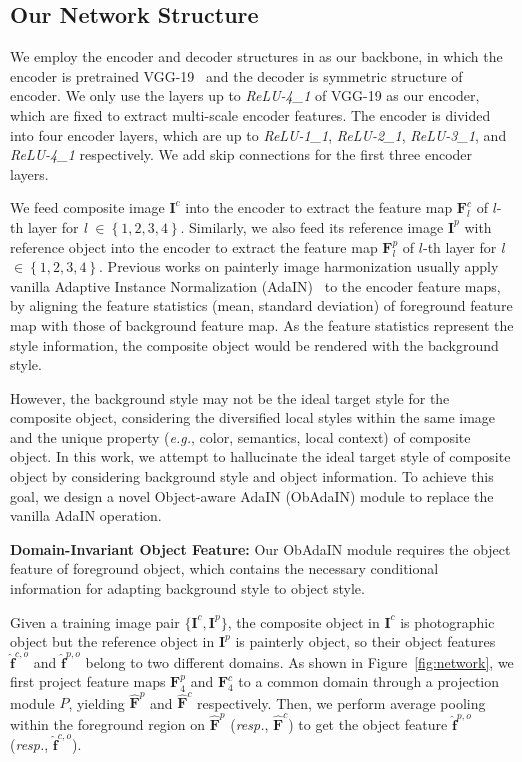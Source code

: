 \documentclass[letterpaper]{article} %
\begin{document}
\subsection{Our Network Structure} \label{sec:network_structure}

We employ the encoder and decoder structures in \cite{huang2017arbitrary} as our backbone, in which the encoder is pretrained VGG-19~\cite{VGG19} and the decoder is symmetric structure of encoder. We only use the layers up to \emph{ReLU-4\_1} of VGG-19 as our encoder, which are fixed to extract multi-scale encoder features. The encoder is divided into four encoder layers, which are up to \emph{ReLU-1\_1}, \emph{ReLU-2\_1}, \emph{ReLU-3\_1}, and \emph{ReLU-4\_1} respectively. We add skip connections for the first three encoder layers.

We feed composite image $\bm{I}^c$ into the encoder to extract the feature map $\bm{F}_l^c$ of $l$-th layer for \emph{l} $\in \left\{1, 2, 3, 4\right\}$. Similarly, we also feed its reference image $\bm{I}^p$ with reference object into the encoder to extract the feature map $\bm{F}^p_l$ of $l$-th layer for \emph{l} $\in \left\{1, 2, 3, 4\right\}$.
Previous works on painterly image harmonization \cite{peng2019element,cao2022painterly} usually apply vanilla Adaptive Instance Normalization (AdaIN)~\cite{huang2017arbitrary} to the encoder feature maps, by aligning the feature statistics (mean, standard deviation) of foreground feature map with those of background feature map. As the feature statistics represent the style information, the composite object would be rendered with the background style.

However, the background style may not be the ideal target style for the composite object, considering the diversified local styles within the same image and the unique property (\emph{e.g.}, color, semantics, local context) of composite object. In this work, we attempt to hallucinate the ideal target style of composite object by considering background style and object information. To achieve this goal, we design a novel Object-aware AdaIN (ObAdaIN) module to replace the vanilla AdaIN operation.

\textbf{Domain-Invariant Object Feature:} Our ObAdaIN module requires the object feature of foreground object, which contains the necessary conditional information for adapting background style to object style.

Given a training image pair $\{\bm{I}^c, \bm{I}^p\}$, the composite object in $\bm{I}^c$ is photographic object but the reference object in $\bm{I}^p$ is painterly object, so their object features $\hat{\bm{f}}^{c,o}$ and $\hat{\bm{f}}^{p,o}$ belong to two different domains. As shown in Figure~\ref{fig:network}, we first project feature maps $\bm{F}^p_4$ and $\bm{F}^c_4$ to a common domain through a projection module $P$, yielding $\hat{\bm{F}}^p$ and $\hat{\bm{F}}^c$ respectively. Then, we perform average pooling within the foreground region on  $\hat{\bm{F}}^p$ (\emph{resp.}, $\hat{\bm{F}}^c$) to get the object feature $\hat{\bm{f}}^{p,o}$ (\emph{resp.}, $\hat{\bm{f}}^{c,o}$).
\end{document}
